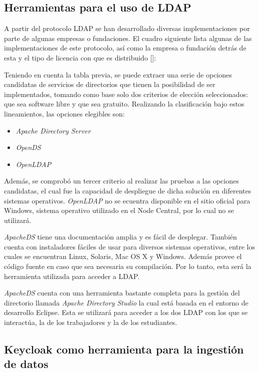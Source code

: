\subsection*{Herramientas para el uso de LDAP}

A partir del protocolo LDAP se han desarrollado diversas implementaciones por parte de algunas empresas o fundaciones. El cuadro siguiente lista algunas de las implementaciones de este protocolo, así como la empresa o fundación detrás de esta y el tipo de licencia con que es distribuido [\cite{gonzalez2010implementacion}]:



Teniendo en cuenta la tabla previa, se puede extraer una serie de opciones candidatas de servicios de directorios que tienen la posibilidad de ser implementados, tomando como base solo dos criterios de elección seleccionados: que sea software libre y que sea gratuito. Realizando la clasificación bajo estos
lineamientos, las opciones elegibles son:

\begin{itemize}
	\item \textit{Apache Directory Server}
	\item \textit{OpenDS}
	\item \textit{OpenLDAP}
\end{itemize}

Además, se comprobó un tercer criterio al realizar las pruebas a las opciones candidatas, el cual fue la capacidad de despliegue de dicha solución en diferentes sistemas operativos. \textit{OpenLDAP} no se ecuentra disponible en el sitio oficial para Windows, sistema operativo utilizado en el Node Central, por lo cual no se utilizará. 

\textit{ApacheDS} tiene una documentación amplia y es fácil de desplegar. También cuenta con instaladores fáciles de usar para diversos sistemas operativos, entre los cuales se encuentran Linux, Solaris, Mac OS X y Windows. Además provee el código fuente en caso que sea necesaria su compilación. Por lo tanto, esta será la herramienta utilizada para acceder a LDAP.

\textit{ApacheDS} cuenta con una herramienta bastante completa para la gestión del directorio llamada \textit{Apache Directory Studio} la cual está basada en el entorno de desarrollo Eclipse. Esta se utilizará para acceder a los dos LDAP con los que se interactúa, la de los trabajadores y la de los estudiantes.

\subsection*{Keycloak como herramienta para la ingestión de datos}
%

